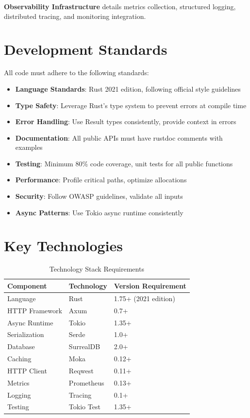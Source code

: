\documentclass[12pt,a4paper,twoside]{report}
\begin{document}
\textbf{Observability Infrastructure} details metrics collection, structured logging, distributed tracing, and monitoring integration.

\section*{Development Standards}

All code must adhere to the following standards:

\begin{itemize}[leftmargin=*]
    \item \textbf{Language Standards}: Rust 2021 edition, following official style guidelines
    \item \textbf{Type Safety}: Leverage Rust's type system to prevent errors at compile time
    \item \textbf{Error Handling}: Use Result types consistently, provide context in errors
    \item \textbf{Documentation}: All public APIs must have rustdoc comments with examples
    \item \textbf{Testing}: Minimum 80\% code coverage, unit tests for all public functions
    \item \textbf{Performance}: Profile critical paths, optimize allocations
    \item \textbf{Security}: Follow OWASP guidelines, validate all inputs
    \item \textbf{Async Patterns}: Use Tokio async runtime consistently
\end{itemize}

\section*{Key Technologies}

\begin{table}[h]
\centering
\begin{tabular}{@{}p{4cm}p{3cm}p{5cm}@{}}
\toprule
\textbf{Component} & \textbf{Technology} & \textbf{Version Requirement} \\
\midrule
Language & Rust & 1.75+ (2021 edition) \\
HTTP Framework & Axum & 0.7+ \\
Async Runtime & Tokio & 1.35+ \\
Serialization & Serde & 1.0+ \\
Database & SurrealDB & 2.0+ \\
Caching & Moka & 0.12+ \\
HTTP Client & Reqwest & 0.11+ \\
Metrics & Prometheus & 0.13+ \\
Logging & Tracing & 0.1+ \\
Testing & Tokio Test & 1.35+ \\
\bottomrule
\end{tabular}
\caption{Technology Stack Requirements}
\label{tab:tech-stack}
\end{table}
\end{document}
